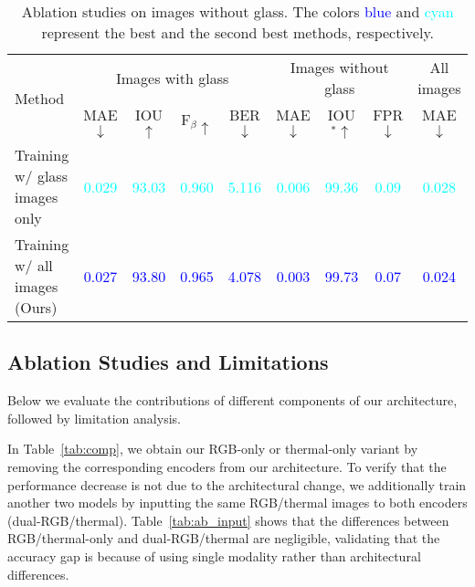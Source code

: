 \begin{table*}[ht]
\renewcommand\arraystretch{1.5}
\setlength\tabcolsep{5pt}
\centering
\caption{Ablation studies on images without glass. The colors \textcolor{blue}{blue} and \textcolor{cyan}{cyan} represent the best and the second best methods, respectively.} 
\label{tab:ab_glass}
\begin{tabular}{lcccccccc} 
\toprule
\multirow{2}{*}{Method} & \multicolumn{4}{c}{Images with glass} & \multicolumn{3}{c}{Images without glass} & All images        \\ 
\cmidrule[0.25pt](lr){2-5} \cmidrule[0.25pt](lr){6-8} \cmidrule[0.25pt](lr){9-9} 
& MAE $\downarrow$                      & IOU $\uparrow$                        & F$_\beta\uparrow$                     & BER $\downarrow$                      & MAE $\downarrow$                      & IOU$^\ast\uparrow$                    & FPR $\downarrow$                     & MAE $\downarrow$  \\ 
\midrule


Training w/ glass images only & \multicolumn{1}{c}{\textcolor{cyan}{0.029}} & \multicolumn{1}{c}{\textcolor{cyan}{93.03}} & \multicolumn{1}{c}{\textcolor{cyan}{0.960}} & \textcolor{cyan}{5.116} & \multicolumn{1}{c}{\textcolor{cyan}{0.006}} & \multicolumn{1}{c}{\textcolor{cyan}{99.36}} & \textcolor{cyan}{0.09} & \textcolor{cyan}{0.028}\\ \hline
Training w/ all images (Ours) & \multicolumn{1}{c}{\textcolor{blue}{0.027}} & \multicolumn{1}{c}{\textcolor{blue}{93.80}} & \multicolumn{1}{c}{\textcolor{blue}{0.965}} & \textcolor{blue}{4.078} & \multicolumn{1}{c}{\textcolor{blue}{0.003}} & \multicolumn{1}{c}{\textcolor{blue}{99.73}} & \textcolor{blue}{0.07} &\textcolor{blue}{0.024}\\ 
\bottomrule
\end{tabular}
\end{table*}




\subsection{Ablation Studies and Limitations}\label{sec:ablation}
Below we evaluate the contributions of different components of our architecture, followed by limitation analysis.

 In Table~\ref{tab:comp}, we obtain our RGB-only or thermal-only variant by removing the corresponding encoders from our architecture. To verify that the performance decrease is not due to the architectural change, we additionally train another two models by inputting the same RGB/thermal images to both encoders (dual-RGB/thermal). Table~\ref{tab:ab_input} shows that the differences between RGB/thermal-only and dual-RGB/thermal are negligible, validating that the accuracy gap is because of using single modality rather than architectural differences. 


